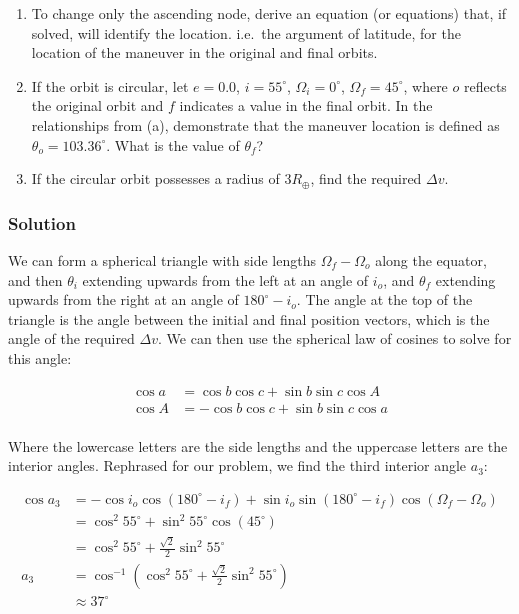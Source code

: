 \begin{enumerate}
    \item To change only the ascending node, derive an equation (or equations) that, if solved, will identify the location. i.e.\ the argument of latitude, for the location of the maneuver in the original and final orbits.
    \item If the orbit is circular, let $e=0.0$, $i=55^\circ$, $\Omega_i=0^\circ$, $\Omega_f=45^\circ$, where $o$ reflects the original orbit and $f$ indicates a value in the final orbit. In the relationships from (a), demonstrate that the maneuver location is defined as $\theta_o = 103.36^\circ$. What is the value of $\theta_f$?
    \item If the circular orbit possesses a radius of $3R_\oplus$, find the required $\Delta v$.
\end{enumerate}

\subsubsection{Solution}

We can form a spherical triangle with side lengths $\Omega_f - \Omega_o$ along the equator, and then $\theta_i$ extending upwards from the left at an angle of $i_o$, and $\theta_f$ extending upwards from the right at an angle of $180^\circ-i_o$. The angle at the top of the triangle is the angle between the initial and final position vectors, which is the angle of the required $\Delta v$. We can then use the spherical law of cosines to solve for this angle:

\begin{align*}
    \cos a &= \cos b \cos c + \sin b \sin c \cos A \\
    \cos A &= - \cos b \cos c + \sin b \sin c \cos a \\
\end{align*}

Where the lowercase letters are the side lengths and the uppercase letters are the interior angles. Rephrased for our problem, we find the third interior angle $a_3$:

\begin{align*}
    \cos a_3 &= - \cos i_o \cos (180^\circ - i_f) + \sin i_o \sin (180^\circ - i_f) \cos(\Omega_f - \Omega_o) \\
    &= \cos^2 55^\circ + \sin^2 55^\circ \cos(45^\circ) \\
    &= \cos^2 55^\circ + \frac{\sqrt{2}}{2} \sin^2 55^\circ \\
    a_3 &= \cos^{-1} \left( \cos^2 55^\circ + \frac{\sqrt{2}}{2} \sin^2 55^\circ \right) \\
    &\approx 37^\circ \\
\end{align*}

